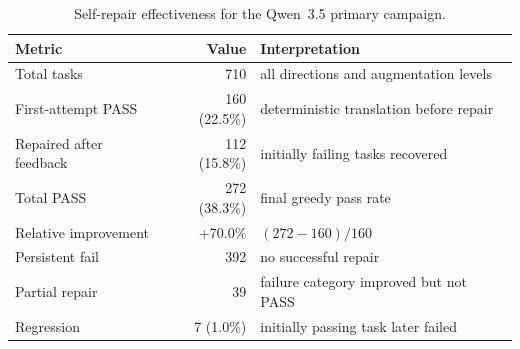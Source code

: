 \begin{table}[htbp]
\centering
\caption{Self-repair effectiveness for the Qwen~3.5 primary campaign.}
\label{tab:self-repair}
\small
\begin{tabular}{@{}lrl@{}}
\toprule
Metric & Value & Interpretation \\
\midrule
Total tasks & 710 & all directions and augmentation levels \\
First-attempt PASS & 160 (22.5\%) & deterministic translation before repair \\
Repaired after feedback & 112 (15.8\%) & initially failing tasks recovered \\
Total PASS & 272 (38.3\%) & final greedy pass rate \\
Relative improvement & +70.0\% & $(272-160)/160$ \\
Persistent fail & 392 & no successful repair \\
Partial repair & 39 & failure category improved but not PASS \\
Regression & 7 (1.0\%) & initially passing task later failed \\
\bottomrule
\end{tabular}
\end{table}


